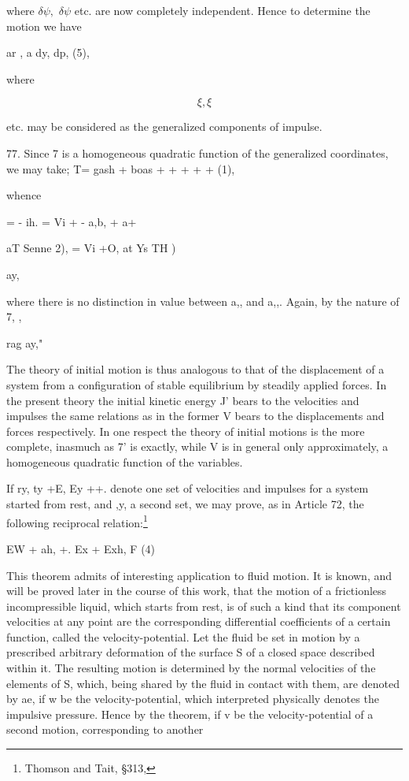 where \(\delta \psi,\) \(\delta \psi\) etc. are now completely independent.
Hence to determine the motion we have

ar , a dy, dp, (5),

where

\[\xi, \xi\]

etc. may be considered as the generalized components of impulse.

77. Since 7 is a homogeneous quadratic function of the generalized coordinates,
we may take; T= gash + boas + + + + + (1),

whence

= - ih. = Vi + - a,b, + a+

aT Senne 2), = Vi +O, at Ys TH )

ay,

where there is no distinction in value between a,, and a,,. Again, by the
nature of 7, ,

rag ay,"

The theory of initial motion is thus  analogous
to that of the displacement of a system from a configuration of stable
equilibrium by steadily applied forces. In the present theory the initial
kinetic energy J' bears to the velocities and impulses the same relations as in
the former V bears to the displacements and forces respectively. In one respect
the theory of initial motions is the more complete, inasmuch as 7' is exactly,
while V is in general only approximately, a homogeneous quadratic function of
the variables.

If ry, ty +E, Ey ++. denote one set of velocities and impulses for a system
started from rest, and ,y, a second set, we may prove, as in Article 72, the
following reciprocal relation:\footnote{Thomson and Tait, \S 313,}

EW + ah, +. Ex + Exh, F (4)

This theorem admits of interesting application to fluid motion. It is known,
and will be proved later in the course of this work, that the motion of a
frictionless incompressible liquid, which starts from rest, is of such a kind
that its component velocities at any point are the corresponding differential
coefficients of a certain function, called the velocity-potential. Let the
fluid be set in motion by a prescribed arbitrary deformation of the surface S
of a closed space described within it. The resulting motion is determined by
the normal velocities of the elements of S, which, being shared by the fluid in
contact with them, are denoted by ae, if w be the velocity-potential, which
interpreted physically denotes the impulsive pressure. Hence by the theorem, if
v be the velocity-potential of a second motion, corresponding to another

